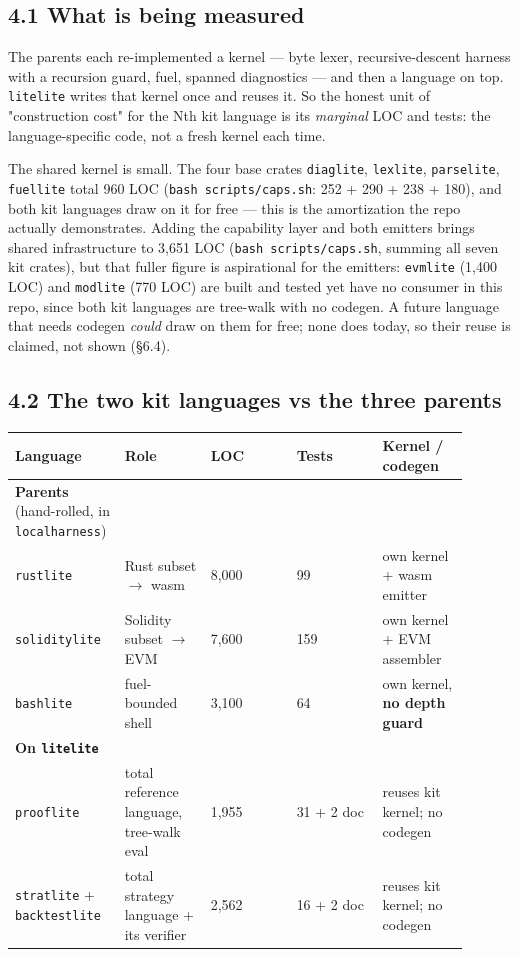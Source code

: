 \documentclass[11pt]{article}
\newcommand{\code}[1]{\texttt{#1}}
\begin{document}
\subsection*{4.1 What is being measured}

The parents each re-implemented a kernel --- byte lexer, recursive-descent harness
with a recursion guard, fuel, spanned diagnostics --- and then a language on top.
\code{litelite} writes that kernel once and reuses it. So the honest unit of
"construction cost" for the Nth kit language is its \emph{marginal} LOC and tests:
the language-specific code, not a fresh kernel each time.

The shared kernel is small. The four base crates \code{diaglite}, \code{lexlite},
\code{parselite}, \code{fuellite} total 960 LOC (\code{bash scripts/caps.sh}:
252 + 290 + 238 + 180), and both kit languages draw on it for free --- this is the
amortization the repo actually demonstrates. Adding the capability layer and
both emitters brings shared infrastructure to 3,651 LOC (\code{bash scripts/caps.sh},
summing all seven kit crates), but that fuller figure is aspirational for the
emitters: \code{evmlite} (1,400 LOC) and \code{modlite} (770 LOC) are built and tested yet
have no consumer in this repo, since both kit languages are tree-walk with no
codegen. A future language that needs codegen \emph{could} draw on them for free; none
does today, so their reuse is claimed, not shown (\S{}6.4).

\subsection*{4.2 The two kit languages vs the three parents}

\begingroup\small
\begin{longtable}{p{0.180\linewidth} p{0.180\linewidth} p{0.180\linewidth} p{0.180\linewidth} p{0.180\linewidth}}
\toprule
\textbf{Language} & \textbf{Role} & \textbf{LOC} & \textbf{Tests} & \textbf{Kernel / codegen} \\
\midrule\endhead
\textbf{Parents} (hand-rolled, in \code{localharness}) &  &  &  &  \\
\code{rustlite} & Rust subset $\rightarrow$ wasm & 8,000 & 99 & own kernel + wasm emitter \\
\code{soliditylite} & Solidity subset $\rightarrow$ EVM & 7,600 & 159 & own kernel + EVM assembler \\
\code{bashlite} & fuel-bounded shell & 3,100 & 64 & own kernel, \textbf{no depth guard} \\
\textbf{On \code{litelite}} &  &  &  &  \\
\code{prooflite} & total reference language, tree-walk eval & 1,955 & 31 + 2 doc & reuses kit kernel; no codegen \\
\code{stratlite} + \code{backtestlite} & total strategy language + its verifier & 2,562 & 16 + 2 doc & reuses kit kernel; no codegen \\
\bottomrule
\end{longtable}\endgroup
\end{document}
